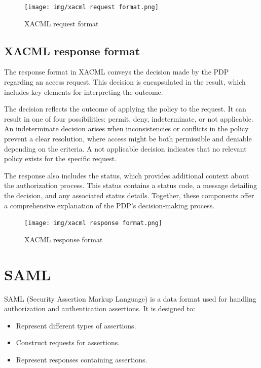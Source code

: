 \begin{figure}[H]
  \centering
  \texttt{[image: img/xacml request
  format.png]}
  \caption{XACML request format}
\end{figure}

\subsection{XACML response format}

The response format in XACML conveys the decision made by the PDP
regarding an access request. This decision is encapsulated in the
result, which includes key elements for interpreting the outcome.  

The decision reflects the outcome of applying the policy to the
request. It can result in one of four possibilities: permit, deny,
indeterminate, or not applicable. An indeterminate decision arises
when inconsistencies or conflicts in the policy prevent a clear
resolution, where access might be both permissible and deniable
depending on the criteria. A not applicable decision indicates that no
relevant policy exists for the specific request.  

The response also includes the status, which provides additional
context about the authorization process. This status contains a status
code, a message detailing the decision, and any associated status
details. Together, these components offer a comprehensive explanation
of the PDP's decision-making process.

\begin{figure}[H]
  \centering
  \texttt{[image: img/xacml response
  format.png]}
  \caption{XACML response format}
\end{figure}

\section{SAML}

SAML (Security Assertion Markup Language) is a data format used for
handling authorization and authentication assertions. It is designed
to:

\begin{itemize}
  \item Represent different types of assertions.
  \item Construct requests for assertions.
  \item Represent responses containing assertions.
\end{itemize}

